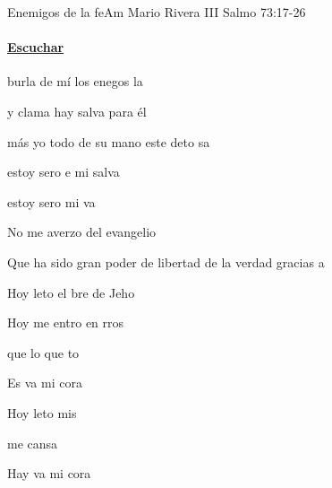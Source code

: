 \documentclass[12pt, spanish]{book}
\begin{document}
    \begin{song}{Enemigos de la fe}{Am}
        {} %
        {Mario Rivera III}
        {Salmo 73:17-26} %
        {}
        \ifChordBk
        \paragraph{\mbox{}\hfill\protect\href{https://open.spotify.com/intl-es/track/4QI0nTdHILexHJBnbq4wMI}{Escuchar}\mbox{}\hfill}
        \fi



        \begin{SBOpGroup}
             burla de mí los enegos  la 

            y clama  hay salva para él

            más yo todo de su mano este deto sa

            estoy sero e mi salva

            estoy sero  mi va
        \end{SBOpGroup}
        \vskip 20pt
        \begin{SBOpGroup}
            No me averzo del evangelio

            Que ha sido gran poder de libertad de la verdad gracias a 

            Hoy leto el bre de Jeho
        \end{SBOpGroup}


        \begin{SBChorus}
            Hoy me entro en rros

            que lo que to

            Es va  mi cora

            Hoy leto mis 

             me cansa

            Hay va  mi cora
        \end{SBChorus}


\end{song}
\end{document}
